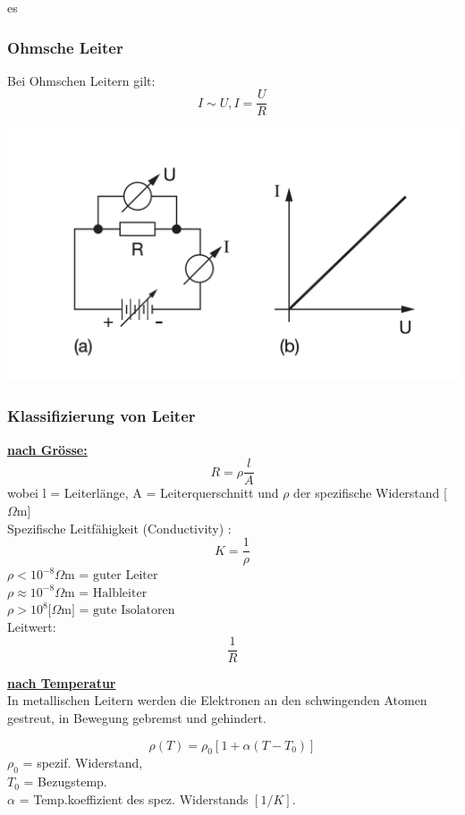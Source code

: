 es\documentclass[a4paper, fontsize=8pt, landscape]{scrartcl}
\newcommand{\hl}[1]{\underline{\textbf{#1}}}
\begin{document}
\begin{multicols*}{4}
\subsubsection{Ohmsche Leiter}
    Bei Ohmschen Leitern gilt:
    \[ I \sim U, I = \frac{U}{R}\]
    \begin{center}
        \includegraphics[scale=0.15]{Images/NichgtOhnscheLeiter.png}
    \end{center}
    \subsubsection{Klassifizierung von Leiter}
    \hl{nach Grösse:}
        \[R = \rho\frac{l}{A}\]
        wobei l = Leiterlänge, A = Leiterquerschnitt und $\rho$ der spezifische Widerstand [$\Omega\text{m}$]\\
        
        Spezifische Leitfähigkeit (Conductivity) :
        \[K = \frac{1}{\rho}\]
        $\rho < 10^{-8} \Omega\text{m = guter Leiter}$\\ 
        $ \rho \approx 10^{-8} \Omega\text{m = Halbleiter }$\\$\rho > 10^8 [\Omega\text{m] = gute Isolatoren}$\\

        Leitwert:\\
        \[\frac{1}{R}\]

    \hl{nach Temperatur}\\
        In metallischen Leitern werden die Elektronen an den schwingenden Atomen gestreut, in Bewegung gebremst und gehindert.
        
        \[\rho(T) = \rho_0[1+\alpha(T - T_0)]\]
        $\rho_0$ = spezif. Widerstand,\\
        $T_0$ = Bezugstemp.\\
        $\alpha$ = Temp.koeffizient des spez. Widerstands $[1/K]$.\\\\
        

\end{multicols*}
\end{document}
